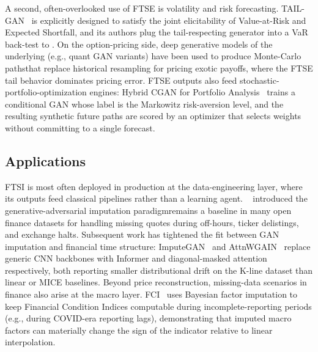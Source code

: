 A second, often-overlooked use of FTSE is volatility and risk
forecasting. TAIL-GAN~\citep{cont2025tailgan} is explicitly designed to
satisfy the joint elicitability of Value-at-Risk and Expected Shortfall,
and its authors plug the tail-respecting generator into a VaR back-test
to . On the option-pricing side,
deep generative models of the underlying (e.g., quant GAN variants) have
been used to produce Monte-Carlo pathsthat replace historical
resampling for pricing exotic payoffs, where the FTSE tail behavior
dominates pricing error. FTSE outputs also feed
stochastic-portfolio-optimization engines: Hybrid CGAN for Portfolio
Analysis~\citep{lu2022hybrid} trains a conditional GAN whose label is
the Markowitz risk-aversion level, and the resulting synthetic future
paths are scored by an optimizer that selects weights without committing
to a single forecast.

\subsection{Applications}

FTSI is most often deployed in production at the data-engineering
layer, where its outputs feed classical pipelines rather than a learning
agent. ~\citep{yoon2018gain} introduced the generative-adversarial
imputation paradigmremains a baseline in many open finance
datasets for handling missing quotes during off-hours, ticker
delistings, and exchange halts. Subsequent work has tightened the fit
between GAN imputation and financial time structure:
ImputeGAN~\citep{qin2023imputegan} and
AttnWGAIN~\citep{wang2025attn} replace generic CNN backbones with
Informer and diagonal-masked attention respectively, both reporting
smaller distributional drift on the K-line dataset than linear or MICE
 baselines. Beyond price reconstruction, missing-data scenarios in
finance also arise at the macro layer.
FCI~\citep{herculano2025financial} uses Bayesian factor imputation to
keep Financial Condition Indices computable during incomplete-reporting
periods (e.g., during COVID-era reporting lags), demonstrating that
imputed macro factors can materially change the sign of the indicator
relative to linear interpolation.

